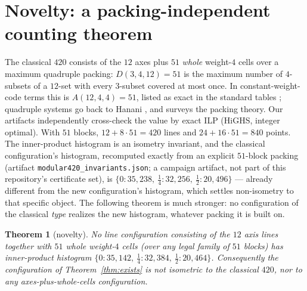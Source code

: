 \documentclass[11pt]{article}
\newtheorem{theorem}{Theorem}
\theoremstyle{remark}
\begin{document}
\section{Novelty: a packing-independent counting theorem}\label{sec:novelty}

The classical $420$ consists of the $12$ axes plus $51$ \emph{whole}
weight-$4$ cells over a maximum quadruple packing: $D(3,4,12)=51$ is the
maximum number of $4$-subsets of a $12$-set with every $3$-subset covered
at most once. In constant-weight-code terms this is $A(12,4,4)=51$, listed
as exact in the standard tables \cite{BSSS90}; quadruple systems go back to
Hanani \cite{Hanani60}, and \cite{HartmanPhelps92} surveys the packing
theory. Our artifacts independently cross-check the value by exact ILP
(HiGHS, integer optimal). With $51$ blocks, $12+8\cdot51=420$ lines and
$24+16\cdot51=840$ points.
The inner-product histogram is an isometry invariant, and the classical
configuration's histogram, recomputed exactly from an explicit $51$-block
packing (artifact \texttt{modular420\_invariants.json}; a campaign
artifact, not part of this repository's certificate set), is
$\{0\!:\!35{,}238,\ \tfrac14\!:\!32{,}256,\ \tfrac12\!:\!20{,}496\}$ ---
already different from the new configuration's histogram, which settles
non-isometry to that specific object. The following theorem is much
stronger: no configuration of the classical \emph{type} realizes the new
histogram, whatever packing it is built on.

\begin{theorem}[novelty]\label{thm:novelty}
No line configuration consisting of the $12$ axis lines together with $51$
whole weight-$4$ cells (over any legal family of $51$ blocks) has
inner-product histogram
$\{0\!:\!35{,}142,\ \tfrac14\!:\!32{,}384,\ \tfrac12\!:\!20{,}464\}$.
Consequently the configuration of Theorem~\ref{thm:exists} is not
isometric to the classical $420$, nor to any axes-plus-whole-cells
configuration.
\end{theorem}
\end{document}
